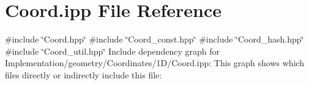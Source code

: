 \hypertarget{Implementation_2geometry_2Coordinates_21D_2Coord_8ipp}{}\section{Coord.\+ipp File Reference}
\label{Implementation_2geometry_2Coordinates_21D_2Coord_8ipp}
{\ttfamily \#include \char`\"{}Coord.\+hpp\char`\"{}}\newline
{\ttfamily \#include \char`\"{}Coord\+\_\+const.\+hpp\char`\"{}}\newline
{\ttfamily \#include \char`\"{}Coord\+\_\+hash.\+hpp\char`\"{}}\newline
{\ttfamily \#include \char`\"{}Coord\+\_\+util.\+hpp\char`\"{}}\newline
Include dependency graph for Implementation/geometry/\+Coordinates/1\+D/\+Coord.ipp\+:
This graph shows which files directly or indirectly include this file\+:
